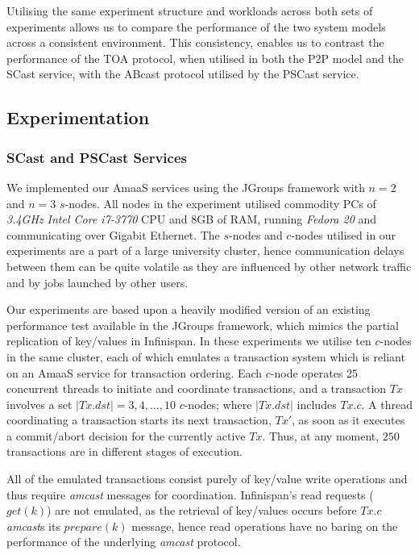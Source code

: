    Utilising the same experiment structure and workloads across both sets of experiments allows us to compare the performance of the two system models across a consistent environment.  This consistency, enables us to contrast the performance of the TOA protocol, when utilised in both the P2P model and the \textsf{SCast} service, with the \textsf{ABcast} protocol utilised by the \textsf{PSCast} service.  

	\subsection{Experimentation}\label{ssec:emulated_transaction_experiments}
	\subsubsection*{\textsf{SCast} and \textsf{PSCast} Services}
	We implemented our \textsf{AmaaS} services using the JGroups\citep{JGroups} framework with $n=2$ and $n=3$ $s$-nodes.  All nodes in the experiment utilised commodity PCs of \emph{3.4GHz Intel Core i7-3770} CPU and 8GB of RAM, running \emph{Fedora 20} and communicating over Gigabit Ethernet. The $s$-nodes and $c$-nodes utilised in our experiments are a part of a large university cluster, hence communication delays between them can be quite volatile as they are influenced by other network traffic and by jobs launched by other users.
	
	Our experiments are based upon a heavily modified version of an existing performance test available in the JGroups\citep{JGroups} framework, which mimics the partial replication of key/values in Infinispan\citep{Infinispan}.  In these experiments we utilise ten $c$-nodes in the same cluster, each of which emulates a transaction system which is reliant on an \textsf{AmaaS} service for transaction ordering.  Each $c$-node operates 25 concurrent threads to initiate and coordinate transactions, and a transaction $Tx$ involves a set $|Tx.dst| = 3,4,\ldots,10$ $c$-nodes; where $|Tx.dst|$ includes $Tx.c$. A thread coordinating a transaction starts its next transaction, $Tx'$, as soon as it executes a commit/abort decision for the currently active $Tx$. Thus, at any moment, $250$ transactions are in different stages of execution.  
	
	All of the emulated transactions consist purely of key/value write operations and thus require \emph{amcast} messages for coordination.  Infinispan's read requests ($get(k)$) are not emulated, as the retrieval of key/values occurs before $Tx.c$ \emph{amcast}s its $prepare(k)$ message, hence read operations have no baring on the performance of the underlying \emph{amcast} protocol.  
	
